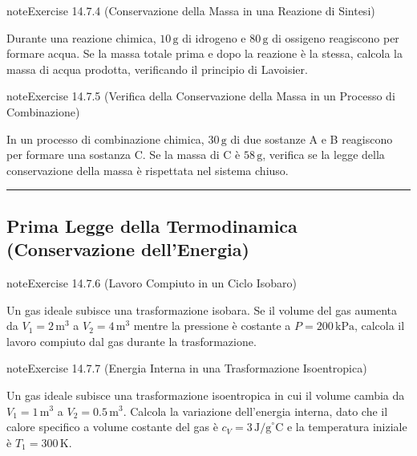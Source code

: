 \documentclass[letterpaper,10pt,italian]{jupyterBook}
\begin{document}
\begin{sphinxadmonition}{note}{Exercise 14.7.4 (Conservazione della Massa in una Reazione di Sintesi)}



\sphinxAtStartPar
Durante una reazione chimica, \(10 \, \text{g}\) di idrogeno e \(80 \, \text{g}\) di ossigeno reagiscono per formare acqua. Se la massa totale prima e dopo la reazione è la stessa, calcola la massa di acqua prodotta, verificando il principio di Lavoisier.
\end{sphinxadmonition}
 \label{exercise:ch/thermodynamics/principles-problems-exercise-4}

\begin{sphinxadmonition}{note}{Exercise 14.7.5 (Verifica della Conservazione della Massa in un Processo di Combinazione)}



\sphinxAtStartPar
In un processo di combinazione chimica, \(30 \, \text{g}\) di due sostanze A e B reagiscono per formare una sostanza C. Se la massa di C è \(58 \, \text{g}\), verifica se la legge della conservazione della massa è rispettata nel sistema chiuso.
\end{sphinxadmonition}


\bigskip\hrule\bigskip



\subsection{Prima Legge della Termodinamica (Conservazione dell’Energia)}
\label{\detokenize{ch/thermodynamics/principles-problems:prima-legge-della-termodinamica-conservazione-dell-energia}} \label{exercise:ch/thermodynamics/principles-problems-exercise-5}

\begin{sphinxadmonition}{note}{Exercise 14.7.6 (Lavoro Compiuto in un Ciclo Isobaro)}



\sphinxAtStartPar
Un gas ideale subisce una trasformazione isobara. Se il volume del gas aumenta da \(V_1 = 2 \, \text{m}^3\) a \(V_2 = 4 \, \text{m}^3\) mentre la pressione è costante a \(P = 200 \, \text{kPa}\), calcola il lavoro compiuto dal gas durante la trasformazione.
\end{sphinxadmonition}
 \label{exercise:ch/thermodynamics/principles-problems-exercise-6}

\begin{sphinxadmonition}{note}{Exercise 14.7.7 (Energia Interna in una Trasformazione Isoentropica)}



\sphinxAtStartPar
Un gas ideale subisce una trasformazione isoentropica in cui il volume cambia da \(V_1 = 1 \, \text{m}^3\) a \(V_2 = 0.5 \, \text{m}^3\). Calcola la variazione dell’energia interna, dato che il calore specifico a volume costante del gas è \(c_V = 3 \, \text{J/g}^\circ \text{C}\) e la temperatura iniziale è \(T_1 = 300 \, \text{K}\).
\end{sphinxadmonition}
 \label{exercise:ch/thermodynamics/principles-problems-exercise-7}
\end{document}
